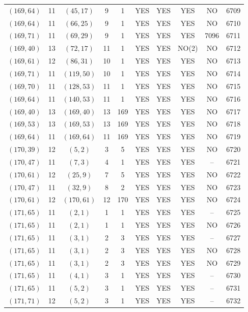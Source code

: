\begin{longtable}{|c|c|c|c|c|c|c|c|c|c|}
$(169, 64)$ & 11 & $(45, 17)$ & 9 & 1 & YES & YES & YES & NO & 6709\\
$(169, 64)$ & 11 & $(66, 25)$ & 9 & 1 & YES & YES & YES & NO & 6710\\
$(169, 71)$ & 11 & $(69, 29)$ & 9 & 1 & YES & YES & YES & 7096 & 6711\\
$(169, 40)$ & 13 & $(72, 17)$ & 11 & 1 & YES & YES & NO(2) & NO & 6712\\
$(169, 61)$ & 12 & $(86, 31)$ & 10 & 1 & YES & YES & YES & NO & 6713\\
$(169, 71)$ & 11 & $(119, 50)$ & 10 & 1 & YES & YES & YES & NO & 6714\\
$(169, 70)$ & 11 & $(128, 53)$ & 11 & 1 & YES & YES & YES & NO & 6715\\
$(169, 64)$ & 11 & $(140, 53)$ & 11 & 1 & YES & YES & YES & NO & 6716\\
$(169, 40)$ & 13 & $(169, 40)$ & 13 & 169 & YES & YES & YES & NO & 6717\\
$(169, 53)$ & 13 & $(169, 53)$ & 13 & 169 & YES & YES & YES & NO & 6718\\
$(169, 64)$ & 11 & $(169, 64)$ & 11 & 169 & YES & YES & YES & NO & 6719\\
$(170, 39)$ & 12 & $(5, 2)$ & 3 & 5 & YES & YES & YES & NO & 6720\\
$(170, 47)$ & 11 & $(7, 3)$ & 4 & 1 & YES & YES & YES & -- & 6721\\
$(170, 61)$ & 12 & $(25, 9)$ & 7 & 5 & YES & YES & YES & NO & 6722\\
$(170, 47)$ & 11 & $(32, 9)$ & 8 & 2 & YES & YES & YES & NO & 6723\\
$(170, 61)$ & 12 & $(170, 61)$ & 12 & 170 & YES & YES & YES & NO & 6724\\
$(171, 65)$ & 11 & $(2, 1)$ & 1 & 1 & YES & YES & YES & -- & 6725\\
$(171, 65)$ & 11 & $(2, 1)$ & 1 & 1 & YES & YES & YES & NO & 6726\\
$(171, 65)$ & 11 & $(3, 1)$ & 2 & 3 & YES & YES & YES & -- & 6727\\
$(171, 65)$ & 11 & $(3, 1)$ & 2 & 3 & YES & YES & YES & NO & 6728\\
$(171, 65)$ & 11 & $(3, 1)$ & 2 & 3 & YES & YES & YES & NO & 6729\\
$(171, 65)$ & 11 & $(4, 1)$ & 3 & 1 & YES & YES & YES & -- & 6730\\
$(171, 65)$ & 11 & $(5, 2)$ & 3 & 1 & YES & YES & YES & -- & 6731\\
$(171, 71)$ & 12 & $(5, 2)$ & 3 & 1 & YES & YES & YES & -- & 6732\\

\end{longtable}
